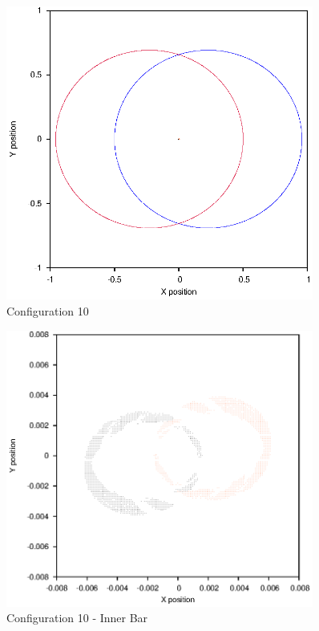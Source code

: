 \documentclass[a4paper,12pt]{article}
\begin{document}
\begin{figure}[H]
\centering
\includegraphics[width=0.9\textwidth]{./2016results/006-6-006-3/Orbit.eps}
\caption{Configuration 10}
\label{fig:config10}
\end{figure}
\begin{figure}[H]
\centering
\includegraphics[width=0.9\textwidth]{./2016results/006-6-006-3/Inner.eps}
\caption{Configuration 10 - Inner Bar}
\label{fig:config10i}
\end{figure}
\end{document}
